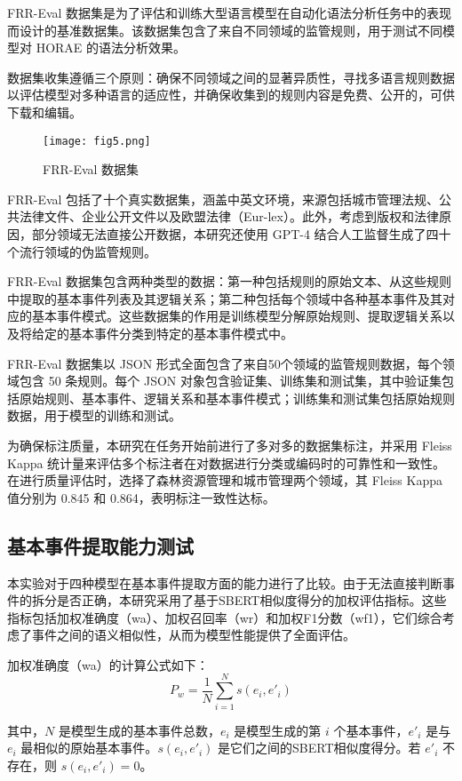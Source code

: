 FRR-Eval 数据集是为了评估和训练大型语言模型在自动化语法分析任务中的表现而设计的基准数据集。该数据集包含了来自不同领域的监管规则，用于测试不同模型对 HORAE 的语法分析效果。

数据集收集遵循三个原则：确保不同领域之间的显著异质性，寻找多语言规则数据以评估模型对多种语言的适应性，并确保收集到的规则内容是免费、公开的，可供下载和编辑。

\begin{figure*}[ht]
    \centering
    \texttt{[image: fig5.png]}
    \caption{FRR-Eval 数据集}
\end{figure*}

FRR-Eval 包括了十个真实数据集，涵盖中英文环境，来源包括城市管理法规、公共法律文件、企业公开文件以及欧盟法律（Eur-lex）。此外，考虑到版权和法律原因，部分领域无法直接公开数据，本研究还使用 GPT-4 结合人工监督生成了四十个流行领域的伪监管规则。

FRR-Eval 数据集包含两种类型的数据：第一种包括规则的原始文本、从这些规则中提取的基本事件列表及其逻辑关系；第二种包括每个领域中各种基本事件及其对应的基本事件模式。这些数据集的作用是训练模型分解原始规则、提取逻辑关系以及将给定的基本事件分类到特定的基本事件模式中。

FRR-Eval 数据集以 JSON 形式全面包含了来自50个领域的监管规则数据，每个领域包含 50 条规则。每个 JSON 对象包含验证集、训练集和测试集，其中验证集包括原始规则、基本事件、逻辑关系和基本事件模式；训练集和测试集包括原始规则数据，用于模型的训练和测试。

为确保标注质量，本研究在任务开始前进行了多对多的数据集标注，并采用 Fleiss Kappa 统计量来评估多个标注者在对数据进行分类或编码时的可靠性和一致性。在进行质量评估时，选择了森林资源管理和城市管理两个领域，其 Fleiss Kappa 值分别为 0.845 和 0.864，表明标注一致性达标。

\subsection{基本事件提取能力测试}

本实验对于四种模型在基本事件提取方面的能力进行了比较。由于无法直接判断事件的拆分是否正确，本研究采用了基于SBERT相似度得分的加权评估指标。这些指标包括加权准确度（wa）、加权召回率（wr）和加权F1分数（wf1），它们综合考虑了事件之间的语义相似性，从而为模型性能提供了全面评估。

加权准确度（wa）的计算公式如下：
\[ P_w = \frac{1}{N} \sum_{i=1}^{N} s(e_i, e'_i) \]

其中，\( N \) 是模型生成的基本事件总数，\( e_i \) 是模型生成的第 \( i \) 个基本事件，\( e'_i \) 是与 \( e_i \) 最相似的原始基本事件。\( s(e_i, e'_i) \) 是它们之间的SBERT相似度得分。若 \( e'_i \) 不存在，则 \( s(e_i, e'_i) = 0 \)。

